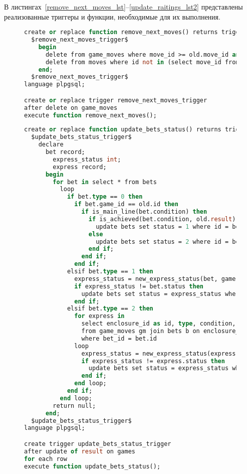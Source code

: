 В листингах~\ref{remove_next_moves_lst}--\ref{update_raitings_lst2} представлены реализованные триггеры и функции, необходимые для их выполнения.
\begin{figure}[H]
	\begin{lstlisting}[label=remove_next_moves_lst,caption=Триггер удаления ходов из шхатманой партии,language=Caml]
create or replace function remove_next_moves() returns trigger as
  $remove_next_moves_trigger$
    begin
      delete from game_moves where move_id >= old.move_id and game_id == old.game_id;
      delete from moves where id not in (select move_id from game_moves);
    end;
  $remove_next_moves_trigger$
language plpgsql;

create or replace trigger remove_next_moves_trigger
after delete on game_moves
execute function remove_next_moves();
	\end{lstlisting}
\end{figure}
\begin{figure}[H]
	\begin{lstlisting}[label=update_bets_status_lst,caption=Триггер проверки выполнения условий ставок,language=Caml]
create or replace function update_bets_status() returns trigger as 
  $update_bets_status_trigger$
    declare
      bet record;
        express_status int;
        express record;
      begin 
        for bet in select * from bets
          loop
            if bet.type == 0 then
              if bet.game_id == old.id then
                if is_main_line(bet.condition) then
                  if is_achieved(bet.condition, old.result) then
                    update bets set status = 1 where id = bet.id;
                  else
                    update bets set status = 2 where id = bet.id;
                  end if;
                end if;
              end if;
            elsif bet.type == 1 then
              express_status = new_express_status(bet, game);
              if express_status != bet.status then
                update bets set status = express_status where id = bet.id;
              end if;
            elsif bet.type == 2 then
              for express in
                select enclosure_id as id, type, condition, coefficient, status, game_id
                from game_moves gm join bets b on enclosure_id = id
                where bet_id = bet.id
              loop
                express_status = new_express_status(express, old);
                if express_status != express.status then
                  update bets set status = express_status where id = express.id;
                end if;
              end loop;
            end if;
          end loop;
        return null;
      end;
  $update_bets_status_trigger$
language plpgsql;

create trigger update_bets_status_trigger
after update of result on games
for each row
execute function update_bets_status();
	\end{lstlisting}
\end{figure}
